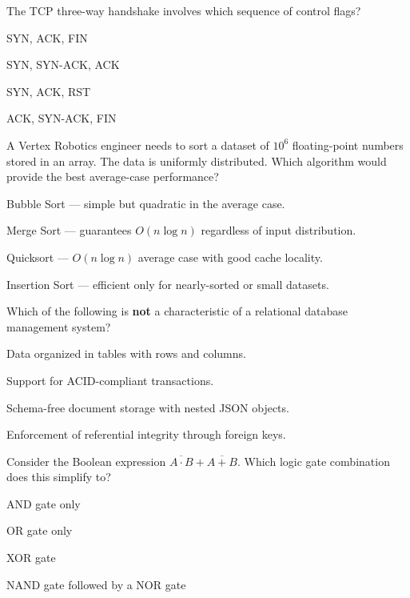 \documentclass[11pt,a4paper]{article}
\begin{document}
\begin{questionblock}
 The TCP three-way handshake involves which sequence of control flags?
\begin{mcoptions}
  \item[\textbf{A.}] SYN, ACK, FIN
  \item[\textbf{B.}] SYN, SYN-ACK, ACK
  \item[\textbf{C.}] SYN, ACK, RST
  \item[\textbf{D.}] ACK, SYN-ACK, FIN
\end{mcoptions}
\end{questionblock}

\begin{questionblock}
 A Vertex Robotics engineer needs to sort a dataset of $10^6$ floating-point numbers stored in an array. The data is uniformly distributed. Which algorithm would provide the best average-case performance?
\begin{mcoptions}
  \item[\textbf{A.}] Bubble Sort --- simple but quadratic in the average case.
  \item[\textbf{B.}] Merge Sort --- guarantees $O(n \log n)$ regardless of input distribution.
  \item[\textbf{C.}] Quicksort --- $O(n \log n)$ average case with good cache locality.
  \item[\textbf{D.}] Insertion Sort --- efficient only for nearly-sorted or small datasets.
\end{mcoptions}
\end{questionblock}

\begin{questionblock}
 Which of the following is \textbf{not} a characteristic of a relational database management system?
\begin{mcoptions}
  \item[\textbf{A.}] Data organized in tables with rows and columns.
  \item[\textbf{B.}] Support for ACID-compliant transactions.
  \item[\textbf{C.}] Schema-free document storage with nested JSON objects.
  \item[\textbf{D.}] Enforcement of referential integrity through foreign keys.
\end{mcoptions}
\end{questionblock}

\begin{questionblock}
 Consider the Boolean expression $\overline{A \cdot B} + \overline{A + B}$. Which logic gate combination does this simplify to?
\begin{mcoptions}
  \item[\textbf{A.}] AND gate only
  \item[\textbf{B.}] OR gate only
  \item[\textbf{C.}] XOR gate
  \item[\textbf{D.}] NAND gate followed by a NOR gate
\end{mcoptions}
\end{questionblock}
\end{document}
